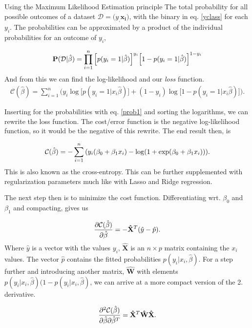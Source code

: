 \documentclass[10pt]{article}
\begin{document}
Using the Maximum Likelihood Estimation %
principle The total probability for all possible outcomes of a dataset
$\mathcal{D} = {(y_, \mathbf{x_i)}}$, with the binary in eq. \ref{yclass} for
each $y_i$. The probabilities can be approximated by a product of the
individual probabilities for an outcome of $y_i$,

\begin{align}
	\mathbf{P}(\mathcal{D}|\hat{\beta}) 
		= \prod_{i=1}^n\qty[p(y_i=1|\hat{\beta})]^{y_i}
			\qty[ 1 - p(y_i=1|\hat{\beta}) ]^{1-y_i}
\end{align}
And from this we can find the log-likelihood and our \emph{loss} function. 
\begin{align}
	\mathcal{C}(\hat{\beta}) = 
		\sum_{i=1}^n \bigg( 
			y_i \log\big[p(y_i=1|x_i\hat{\beta})\big] + 
			(1 - y_i)\log\big[ 1 - p(y_i=1|x_i\hat{\beta})\big]\bigg).
\end{align}

Inserting for the probabilities with eq. \ref{prob1} and sorting the logarithms, we can
rewrite the loss function. The cost/error function is the negative log-likelihood function, so it
would be the negative of this rewrite. The end result then, is

\begin{align}
	\mathcal{C}(\hat{\beta}) = 
		-\sum_{i=1}^n \qty(y_i(\beta_0 + \beta_1x_i) - \log(1 + \exp(\beta_0 + \beta_1x_i)))
		\label{costfunc}.
\end{align}
This is also known as the cross-entropy. This can be further supplemented with regularization
parameters much like with Lasso and Ridge regression. 

The next step then is to minimize the cost function. Differentiating wrt. $\beta_0$ and $\beta_1$
and compacting, gives us

\begin{align}
	\pdv{\mathcal{C}(\hat{\beta})}{\hat{\beta}} = 
		- \mathbf{\hat{X}}^T (\hat{y} - \hat{p}).
	\label{Cost1stDerivative}
\end{align}
Where $\hat{y}$ is a vector with the values $y_i$, $\mathbf{\hat{X}}$ is an $n\times p$ matrix containing 
the $x_i$ values. The vector $\hat{p}$ contains the fitted probabilities $p(y_i|x_i,\hat{\beta})$. For 
a step further and introducing another matrix, $\mathbf{\hat{W}}$ with elements 
$p(y_i|x_i,\hat{\beta})(1 - p(y_i|x_i,\hat{\beta})$, we can arrive at a more compact version of the 
2. derivative. 

\begin{align}
	\pdv[2]{\mathcal{C}(\hat{\beta})}{\hat{\beta}}{\hat{\beta}^T} 
		= \mathbf{\hat{X}}^T \mathbf{\hat{W}} \mathbf{\hat{X}}
	\label{Cost2ndDerivative}.
\end{align}
\end{document}

